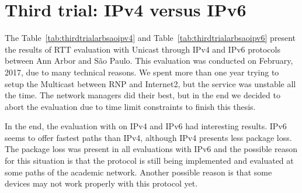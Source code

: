 \section{Third trial: IPv4 versus IPv6}


The Table~\ref{tab:thirdtrialarbsaoipv4} and Table~\ref{tab:thirdtrialarbsaoipv6} present the results of RTT evaluation with Unicast through IPv4 and IPv6 protocols between Ann Arbor and São Paulo.
This evaluation was conducted on February, 2017, due to many technical reasons.
We spent more than one year trying to setup the Multicast between RNP and Internet2, but the service was unstable all the time.
The network managers did their best, but in the end we decided to abort the evaluation due to time limit constraints to finish this thesis.

In the end, the evaluation with on IPv4 and IPv6 had interesting results.
IPv6 seems to offer fastest paths than IPv4, although IPv4 presents less package loss.
The package loss was present in all evaluations with IPv6 and the possible reason for this situation is that the protocol is still being implemented and evaluated at some paths of the academic network.
Another possible reason is that some devices may not work properly with this protocol yet.


